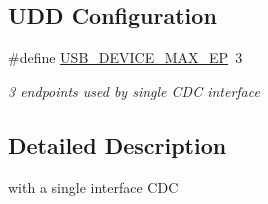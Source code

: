 \subsection*{\-U\-D\-D \-Configuration}
\begin{DoxyCompactItemize}
\item 
\#define \hyperlink{group__udi__cdc__group__conf_ga94a9c8812ccfd31f8b0398b666c54453}{\-U\-S\-B\-\_\-\-D\-E\-V\-I\-C\-E\-\_\-\-M\-A\-X\-\_\-\-E\-P}~3
\begin{DoxyCompactList}\small\item\em 3 endpoints used by single \-C\-D\-C interface \end{DoxyCompactList}\end{DoxyCompactItemize}


\subsection{\-Detailed \-Description}
with a single interface \-C\-D\-C 

